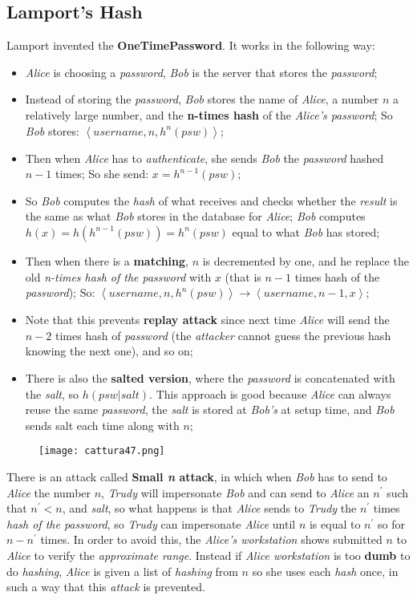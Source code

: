 \documentclass{article}
\begin{document}
\subsection{Lamport's Hash}
Lamport invented the \textbf{OneTimePassword}. It works in the following way: 
\begin{itemize}
\item \emph{Alice} is choosing a \emph{password}, \emph{Bob} is the server that stores the \emph{password};
\item Instead of storing the \emph{password}, \emph{Bob} stores the name of \emph{Alice}, a number $n$ a relatively large number, and the\textbf{ n-times hash} of the \emph{Alice’s password};
\subitem So \emph{Bob} stores: $\left \langle username , n , h^n(psw) \right \rangle$;
\item Then when \emph{Alice} has to \emph{authenticate}, she sends \emph{Bob} the \emph{password} hashed $n-1$ times;
\subitem So she send: $x = h^{n-1}(psw)$;
\item So \emph{Bob} computes the \emph{hash} of what receives and checks whether the \emph{result} is the same as what \emph{Bob} stores in the database for \emph{Alice};
\subitem \emph{Bob} computes $h(x) = h( h^{n-1}(psw)) = h^n(psw)$ equal to what \emph{Bob} has stored;
\item Then when there is a \textbf{matching}, $n$ is decremented by one, and he replace the old \emph{n-times hash of the password} with $x$ (that is $n-1$ times hash of the \emph{password});
\subitem So: $\left \langle username , n , h^n(psw) \right \rangle \rightarrow \left \langle username , n-1 , x \right \rangle$;
\item Note that this prevents \textbf{replay attack} since next time \emph{Alice} will send the $n-2$ times hash of \emph{password} (the \emph{attacker} cannot guess the previous hash knowing the next one), and so on;
\item There is also the \textbf{salted version}, where the \emph{password} is concatenated with the \emph{salt}, so $h(psw|salt)$. This approach is good because \emph{Alice} can always reuse the same \emph{password}, the \emph{salt} is stored at \emph{Bob's} at setup time, and \emph{Bob} sends salt each time along with $n$; 
\end{itemize}
\begin{figure}[H]
  \centering
  \texttt{[image: cattura47.png]}
\end{figure}
There is an attack called \textbf{Small \emph{n} attack}, in which when \emph{Bob} has to send to \emph{Alice} the number $n$, \emph{Trudy} will impersonate \emph{Bob} and can send to \emph{Alice} an $n^{'}$ such that $n^{'}<n$, and \emph{salt}, so what happens is that \emph{Alice} sends to \emph{Trudy} the $n^{'}$ times \emph{hash of the password}, so \emph{Trudy} can impersonate \emph{Alice} until $n$ is equal to $n^{'}$ so for $n - n^{'}$ times. In order to avoid this, the \emph{Alice's workstation} shows submitted $n$ to \emph{Alice} to verify the \emph{approximate range}. Instead if \emph{Alice workstation} is too \textbf{dumb} to do \emph{hashing}, \emph{Alice} is given a list of \emph{hashing} from $n$ so she uses each \emph{hash} once, in such a way that this \emph{attack} is prevented. 
\end{document}
